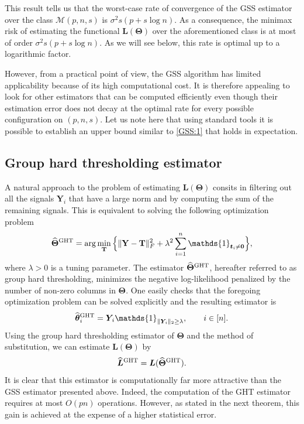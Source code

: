 \documentclass[sts,preprint,reqno,a4paper]{imsart}
\def\l{\lambda}
\def\bt{\boldsymbol\theta}
\def\bTheta{\boldsymbol\Theta}
\def\bY{\boldsymbol Y\!}
\def\bL{\boldsymbol L}
\def\bfY{\mathbf Y}
\def\bfT{\mathbf\Theta}
\def\fcar{\mathds{1}}
\def\calM{\mathcal M}
\def\hat{\widehat}
\theoremstyle{plain}
\theoremstyle{remark}
\theoremstyle{definition}
\begin{document}
This result tells us that the worst-case rate of convergence of the GSS estimator over the class $\calM(p,n,s)$ is $\sigma^2 s(p+s\log n)$. As a consequence, the minimax risk of estimating the functional $\bL(\bTheta)$
over the aforementioned class is at most of order $\sigma^2 s(p+s\log n)$.
As we will see below, this rate is optimal up to a logarithmic factor.

However, from  a practical point of view, the GSS algorithm has limited
applicability because of its high computational cost. It is therefore
appealing to look for other estimators that can be computed efficiently
even though their estimation error does not decay at the optimal rate
for every possible configuration on $(p,n,s)$. Let us note here that
using standard tools it is possible to establish an upper bound similar
to \eqref{GSS:1} that holds in expectation.

\subsection{Group hard thresholding estimator}

A natural approach to the problem of estimating $\bL(\bTheta)$ consits
in filtering out all the signals $\bY_i$ that have a large norm and by
computing the sum of the remaining signals. This is equivalent to solving
the following optimization problem
\begin{equation}\label{definition_HT}
	\hat{\bfT}{}^{\rm GHT} =
	\arg\min_{\mathbf T} \Big\{ \|\bfY-{\mathbf T}\|_F^2 + \lambda^2 \sum_{i=1}^n
	\fcar_{\boldsymbol t_i\neq\mathbf 0} \Big\},
\end{equation}
where $\l>0$ is a tuning parameter. The estimator $\hat{\bfT}{}^{\rm GHT}$,
hereafter referred to as group hard thresholding, minimizes the negative log-likelihood penalized by the number of non-zero columns in $\bTheta$.
One easily checks that the foregoing optimization problem can be solved
explicitly and the resulting estimator is
\begin{equation}
	\hat{\bt}{}^{\rm GHT}_i = \bY_i \fcar_{\|\bY_i\|_2 \ge \lambda},\qquad
	i\in[n].
\end{equation}
Using the group hard thresholding estimator of $\bTheta$ and the method of
substitution, we can estimate $\bL(\bfT)$ by
\begin{equation}\label{definition_LHT}
	\hat{\bL}{}^{\rm GHT}=\bL(\hat{\bfT}{}^{\rm GHT}).
\end{equation}
It is clear that this estimator is computationally far more attractive than
the GSS estimator presented above. Indeed, the computation of the GHT
estimator requires at most $O(pn)$ operations. However, as stated in the
next theorem, this gain is achieved at the expense of a higher
statistical error.
\end{document}
